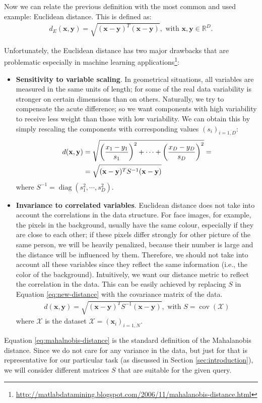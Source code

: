 Now we can relate the previous definition with the most common and used example: Euclidean distance. This is defined as:
\begin{align}
 d_E(\mathbf{x},\mathbf{y}) = \sqrt{(\mathbf{x-y})^T(\mathbf{x-y})}, \mbox{ with }\mathbf{x,y}\in \mathbb{R}^D.
\end{align}

Unfortunately, the Euclidean distance has two major drawbacks that are problematic especially in machine learning applications\footnote{\url{http://matlabdatamining.blogspot.com/2006/11/mahalanobis-distance.html}}:
\begin{itemize}
 \item{ \textbf{Sensitivity to variable scaling}. In geometrical situations, all variables are measured in the same units of length; for some of the real data variability is stronger on certain dimensions than on others. Naturally, we try to compensate the acute difference; so we want components with high variability to receive less weight than those with low variability. We can obtain this by simply rescaling the components with corresponding values $(s_i)_{i=\overline{1,D}}$: 
  \begin{align}
   d(\mathbf{x},\mathbf{y}) &= \sqrt{\left(\frac{x_1-y_1}{s_1}\right)^2+\cdots+\left(\frac{x_D-y_D}{s_D}\right)^2} = \notag\\
   &= \sqrt{(\mathbf{x-y})^TS^{-1}(\mathbf{x-y})} \label{eq:new-distance}
  \end{align}
 where $S^{-1}=\operatorname{diag}(s_1^2,\cdots,s_D^2)$. 
 }
 \item{ \textbf{Invariance to correlated variables}. Euclidean distance does not take into account the correlations in the data structure. For face images, for example, the pixels in the background, usually have the same colour, especially if they are close to each other; if these pixels differ strongly for other picture of the same person, we will be heavily penalized, because their number is large and the distance will be influenced by them. Therefore, we should not take into account all these variables since they reflect the same information (i.e., the color of the background). Intuitively, we want our distance metric to reflect the correlation in the data. This can be easily achieved by replacing $S$ in Equation \eqref{eq:new-distance} with the covariance matrix of the data.
 \begin{align}
 d(\mathbf{x},\mathbf{y}) = \sqrt{(\mathbf{x-y})^TS^{-1}(\mathbf{x-y})}, \mbox{ with } S = \operatorname{cov}(\mathcal{X})
 \label{eq:mahalnobis-distance}
 \end{align}
 where $\mathcal{X}$ is the dataset $\mathcal{X}=(\mathbf{x}_i)_{i=\overline{1,N}}$. 
 }
\end{itemize}
Equation \eqref{eq:mahalnobis-distance} is the standard definition of the Mahalanobis distance. Since we do not care for any variance in the data, but just for that is representative for our particular task (as discussed in Section \ref{sec:introduction}), we will consider different matrices $S$ that are suitable for the given query. 

